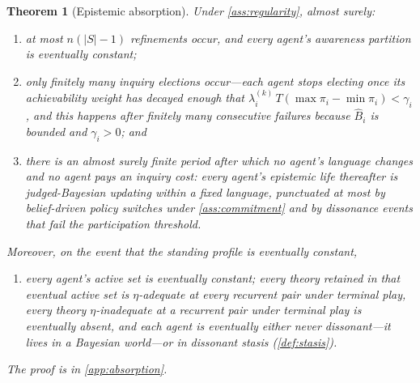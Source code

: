 \documentclass[11pt]{article}
\newtheorem{theorem}[assumption]{Theorem}
\theoremstyle{definition}
\begin{document}
\begin{theorem}[Epistemic absorption]
\label{thm:absorption}
Under \cref{ass:regularity}, almost surely:
\begin{enumerate}[label=(\alph*)]
  \item at most $n(|S|-1)$ refinements occur, and every agent's awareness partition is eventually constant;
  \item only finitely many inquiry elections occur---each agent stops electing once its achievability weight has decayed enough that $\lambda_i^{(k)}\,T(\max \pi_i-\min \pi_i)<\gamma_i$, and this happens after finitely many consecutive failures because $\widehat B_i$ is bounded and $\gamma_i>0$; and
  \item there is an almost surely finite period after which no agent's language changes and no agent pays an inquiry cost: every agent's epistemic life thereafter is judged-Bayesian updating within a fixed language, punctuated at most by belief-driven policy switches under \cref{ass:commitment} and by dissonance events that fail the participation threshold.
\end{enumerate}
Moreover, on the event that the standing profile is eventually constant,
\begin{enumerate}[label=(\alph*),start=4]
  \item every agent's active set is eventually constant; every theory retained in that eventual active set is $\eta$-adequate at every recurrent pair under terminal play, every theory $\eta$-inadequate at a recurrent pair under terminal play is eventually absent, and each agent is eventually either never dissonant---it lives in a Bayesian world---or in dissonant stasis (\cref{def:stasis}).
\end{enumerate}
The proof is in \cref{app:absorption}.
\end{theorem}
\end{document}
